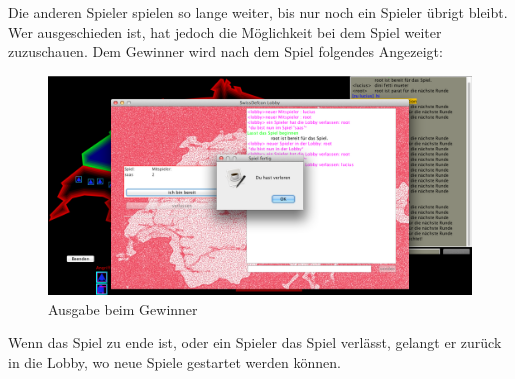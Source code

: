 \documentclass[ngerman, 12pt, pdftex]{scrartcl}[2006/07/30]
\begin{document}
Die anderen Spieler spielen so lange weiter, bis nur noch ein Spieler übrigt bleibt. Wer ausgeschieden ist, hat jedoch die Möglichkeit bei dem Spiel weiter zuzuschauen.
Dem Gewinner wird nach dem Spiel folgendes Angezeigt:

\begin{figure}[h]
\centering
\includegraphics[scale=0.29]{spiel/gewonnen.png}
\caption{Ausgabe beim Gewinner}
\end{figure}

Wenn das Spiel zu ende ist, oder ein Spieler das Spiel verlässt, gelangt er zurück in die Lobby, wo neue Spiele gestartet werden können.
\end{document}
